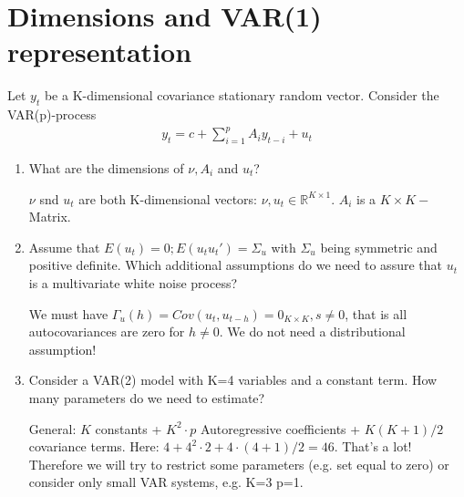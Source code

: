 \documentclass[a4paper]{scrartcl}
\begin{document}
    \section{Dimensions and VAR(1) representation}
    Let $y_t$ be a K-dimensional covariance stationary random vector. Consider the VAR(p)-process
    \begin{align*}
        y_t = c + \sum_{i=1}^p A_i {y_{t-i}} + u_t
    \end{align*}
    \begin{enumerate}
        \item What are the dimensions of $\nu, A_i$ and $u_{t}$?
              \begin{solution}
                  $\nu$ snd $u_t$ are both K-dimensional vectors: $\nu,u_t \in \mathbb{R}^{K \times 1}$. $A_i$ is a $K \times K-$Matrix.
              \end{solution}
        \item Assume that $E(u_t) = 0; E(u_t u_t') = \Sigma_u$ with $\Sigma_u$ being symmetric and positive definite. Which additional assumptions do we need to assure that $u_t$ is a multivariate white noise process?
              \begin{solution}

                  We must have ${\Gamma_u(h)} = Cov(u_t, u_{t-h}) = 0_{K\times K},s\neq0$, that is all autocovariances are zero for $h\neq0$. We do not need a distributional assumption!
              \end{solution}
        \item Consider a VAR(2) model with K=4 variables and a constant term. How many parameters do we need to estimate?
              \begin{solution}

                  General: $K$ constants + $K^2\cdot p$ Autoregressive coefficients + $K(K+1)/2$ covariance terms. Here: $4+4^2\cdot2+4\cdot(4+1)/2=46$. That's a lot! Therefore we will try to restrict some parameters (e.g. set equal to zero) or consider only small VAR systems, e.g. K=3 p=1.
                  

\end{solution}
\end{enumerate}
\end{document}
